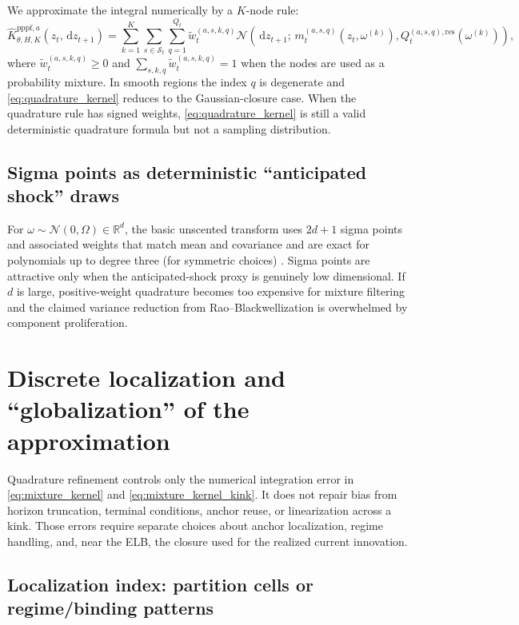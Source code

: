 \documentclass[11pt]{article}
\theoremstyle{remark}
\newcommand{\R}{\mathbb{R}}
\newcommand{\dd}{\,\mathrm{d}}
\begin{document}
We approximate the integral numerically by a $K$-node rule:
\begin{equation}
\widehat K_{\theta,H,K}^{\mathrm{pppf},a}(z_t,\dd z_{t+1})
=
\sum_{k=1}^K \sum_{s\in\mathcal{S}_t}\sum_{q=1}^{Q_t}
\tilde w_t^{(a,s,k,q)}
\mathcal{N}\!\left(\dd z_{t+1};\,m_t^{(a,s,q)}(z_t,\omega^{(k)}),Q_t^{(a,s,q),\mathrm{res}}(\omega^{(k)})\right),
\label{eq:quadrature_kernel}
\end{equation}
where $\tilde w_t^{(a,s,k,q)}\ge 0$ and $\sum_{s,k,q}\tilde w_t^{(a,s,k,q)}=1$ when the nodes are used as a probability mixture.
In smooth regions the index $q$ is degenerate and \eqref{eq:quadrature_kernel} reduces to the Gaussian-closure case.
When the quadrature rule has signed weights, \eqref{eq:quadrature_kernel} is still a valid deterministic quadrature formula but not a sampling distribution.

\subsection{Sigma points as deterministic ``anticipated shock'' draws}

For $\omega\sim \mathcal{N}(0,\Omega)\in\R^d$, the basic unscented transform uses $2d+1$ sigma points and associated weights that match mean and covariance and are exact for polynomials up to degree three (for symmetric choices) \citep{JulierUhlmann2004}.
Sigma points are attractive only when the anticipated-shock proxy is genuinely low dimensional.
If $d$ is large, positive-weight quadrature becomes too expensive for mixture filtering and the claimed variance reduction from Rao--Blackwellization is overwhelmed by component proliferation.

\section{Discrete localization and ``globalization'' of the approximation}
\label{sec:localization}

Quadrature refinement controls only the numerical integration error in \eqref{eq:mixture_kernel} and \eqref{eq:mixture_kernel_kink}.
It does not repair bias from horizon truncation, terminal conditions, anchor reuse, or linearization across a kink.
Those errors require separate choices about anchor localization, regime handling, and, near the ELB, the closure used for the realized current innovation.

\subsection{Localization index: partition cells or regime/binding patterns}
\end{document}
